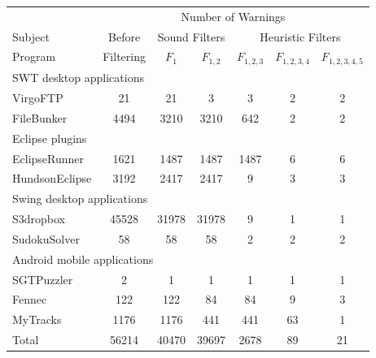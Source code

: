 \begin{table}[t]
\begin{center}
 \fontsize{9pt}{\baselineskip}\selectfont
\setlength{\tabcolsep}{.46\tabcolsep}
\hspace*{-0.2cm}
\begin{tabular}{|l||c|c|c|c|c|c|}
\hline
 & \multicolumn{6}{|c|}{Number of Warnings}  \\
\cline{2-7}
 Subject & Before & \multicolumn{2}{|c|}{Sound Filters}  &  \multicolumn{3}{|c|}{Heuristic Filters}  \\
\cline{3-7}
 Program &Filtering  & $F_1$ & $F_{1,2}$ & $F_{1,2,3}$&$F_{1,2,3,4}$ & $F_{1,2,3,4,5}$\\
\hline \hline
\multicolumn{7}{|l|}{SWT desktop applications}   \\
 \hline
 VirgoFTP &  21 &  21 &  3 & 3 &  2 & 2\\
 \hline
 FileBunker &  4494 &  3210 &  3210 &  642 &  2 & 2\\
 \hline
 \hline
\multicolumn{7}{|l|}{Eclipse plugins}   \\
 \hline
 EclipseRunner&  1621 &  1487 &  1487 & 1487 &  6 & 6\\
 \hline
 HundsonEclipse&  3192 &  2417 &  2417 & 9 &  3 & 3\\
 \hline
 \hline
\multicolumn{7}{|l|}{Swing desktop applications}   \\
 \hline
 S3dropbox&  45528 &  31978 &  31978 & 9 &  1 & 1\\
 \hline
 SudokuSolver &  58 &  58 &  58 & 2 &  2 & 2\\
 \hline
 \hline
\multicolumn{7}{|l|}{Android mobile applications}   \\
 \hline
 SGTPuzzler&  2 &  1 &  1 & 1 &  1 & 1\\
 \hline
 Fennec &  122 &  122 & 84 & 84 &  9 & 3\\
 \hline
 MyTracks &  1176 &  1176 &  441 & 441 &  63 & 1 \\
\hline
 \hline
 Total &  56214 &  40470 &  39697 &  2678 &  89 & 21 \\
 \hline
\end{tabular}
\end{center}
\vspace{-15pt}
\end{table}


